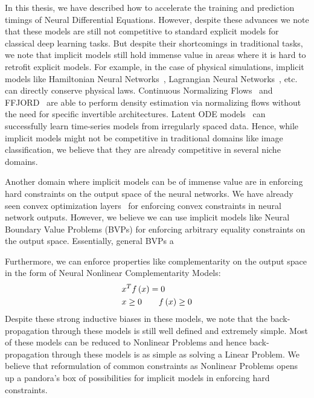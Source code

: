 In this thesis, we have described how to accelerate the training and prediction timings of Neural Differential Equations. However, despite these advances we note that these models are still not competitive to standard explicit models for classical deep learning tasks. But despite their shortcomings in traditional tasks, we note that implicit models still hold immense value in areas where it is hard to retrofit explicit models. For example, in the case of physical simulations, implicit models like Hamiltonian Neural Networks~\citep{greydanus2019hamiltonian}, Lagrangian Neural Networks~\citep{cranmer2020lagrangian}, etc. can directly conserve physical laws. Continuous Normalizing Flows~\citep{chen2018neural} and FFJORD~\citep{grathwohl2018ffjord} are able to perform density estimation via normalizing flows without the need for specific invertible architectures. Latent ODE models~\citep{rubanova2019latent} can successfully learn time-series models from irregularly spaced data. Hence, while implicit models might not be competitive in traditional domains like image classification, we believe that they are already competitive in several niche domains.

Another domain where implicit models can be of immense value are in enforcing hard constraints on the output space of the neural networks. We have already seen convex optimization layers~\citep{agrawal2019differentiable} for enforcing convex constraints in neural network outputs. However, we believe we can use implicit models like Neural Boundary Value Problems (BVPs) for enforcing arbitrary equality constraints on the output space. Essentially, general  BVPs a 

Furthermore, we can enforce properties like complementarity on the output space in the form of Neural Nonlinear Complementarity Models:
%
\begin{align}
    &x^T f\left(x\right) = 0\\
    & x \geq 0 \qquad f\left(x\right) \geq 0
\end{align}
%
Despite these strong inductive biases in these models, we note that the back-propagation through these models is still well defined and extremely simple. Most of these models can be reduced to Nonlinear Problems and hence back-propagation through these models is as simple as solving a Linear Problem. We believe that reformulation of common constraints as Nonlinear Problems opens up a pandora's box of possibilities for implicit models in enforcing hard constraints.